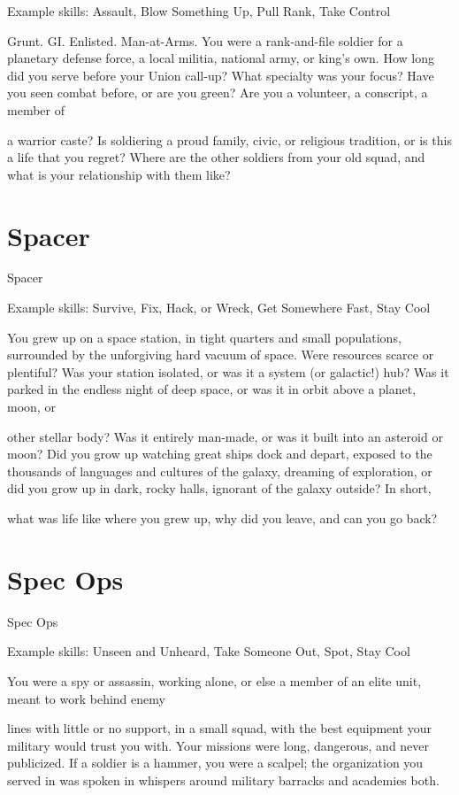 Example skills: Assault, Blow Something Up, Pull Rank, Take Control  

Grunt. GI. Enlisted. Man-at-Arms. You were a rank-and-file soldier for a planetary defense force, a local  
militia, national army, or king’s own. How long did you serve before your Union call-up? What specialty was  
your focus? Have you seen combat before, or are you green? Are you a volunteer, a conscript, a member of  

a warrior caste? Is soldiering a proud family, civic, or religious tradition, or is this a life that you regret?  
Where are the other soldiers from your old squad, and what is your relationship with them like?   
\section{Spacer}
                                                       Spacer
 

Example skills: Survive, Fix, Hack, or Wreck, Get Somewhere Fast, Stay Cool  

You grew up on a space station, in tight quarters and small populations, surrounded by the unforgiving hard  
vacuum of space. Were resources scarce or plentiful? Was your station isolated, or was it a system (or  
galactic!) hub? Was it parked in the endless night of deep space, or was it in orbit above a planet, moon, or  

other stellar body? Was it entirely man-made, or was it built into an asteroid or moon? Did you grow up  
watching great ships dock and depart, exposed to the thousands of languages and cultures of the galaxy,  
dreaming of exploration, or did you grow up in dark, rocky halls, ignorant of the galaxy outside? In short,  

what was life like where you grew up, why did you leave, and can you go back?   
\section{Spec Ops}
                                                     Spec Ops  

Example skills: Unseen and Unheard, Take Someone Out, Spot, Stay Cool  

You were a spy or assassin, working alone, or else a member of an elite unit, meant to work behind enemy  

lines with little or no support, in a small squad, with the best equipment your military would trust you with.  
Your missions were long, dangerous, and never publicized. If a soldier is a hammer, you were a scalpel; the  
organization you served in was spoken in whispers around military barracks and academies both.   
